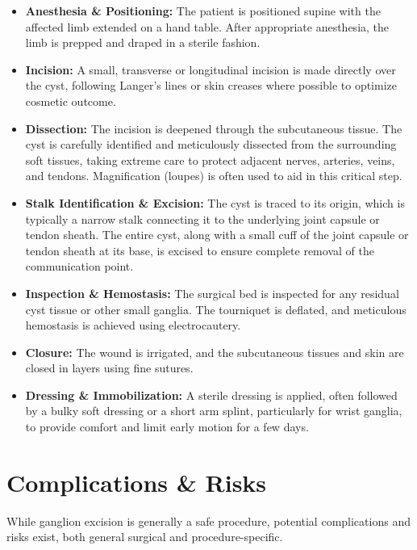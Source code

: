 \begin{itemize}
  \item \textbf{Anesthesia \& Positioning:} The patient is positioned supine with the affected limb extended on a hand table. After appropriate anesthesia, the limb is prepped and draped in a sterile fashion.
  
  \item \textbf{Incision:} A small, transverse or longitudinal incision is made directly over the cyst, following Langer's lines or skin creases where possible to optimize cosmetic outcome.
  
  \item \textbf{Dissection:} The incision is deepened through the subcutaneous tissue. The cyst is carefully identified and meticulously dissected from the surrounding soft tissues, taking extreme care to protect adjacent nerves, arteries, veins, and tendons. Magnification (loupes) is often used to aid in this critical step.
  
  \item \textbf{Stalk Identification \& Excision:} The cyst is traced to its origin, which is typically a narrow stalk connecting it to the underlying joint capsule or tendon sheath. The entire cyst, along with a small cuff of the joint capsule or tendon sheath at its base, is excised to ensure complete removal of the communication point.
  
  \item \textbf{Inspection \& Hemostasis:} The surgical bed is inspected for any residual cyst tissue or other small ganglia. The tourniquet is deflated, and meticulous hemostasis is achieved using electrocautery.
  
  \item \textbf{Closure:} The wound is irrigated, and the subcutaneous tissues and skin are closed in layers using fine sutures.
  
  \item \textbf{Dressing \& Immobilization:} A sterile dressing is applied, often followed by a bulky soft dressing or a short arm splint, particularly for wrist ganglia, to provide comfort and limit early motion for a few days.
\end{itemize}

\section*{Complications \& Risks}
While ganglion excision is generally a safe procedure, potential complications and risks exist, both general surgical and procedure-specific.

